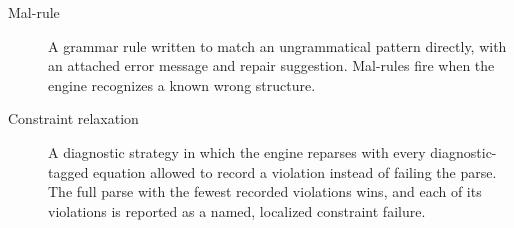 \documentclass[11pt]{article}
\theoremstyle{definition}
\theoremstyle{plain}
\theoremstyle{remark}
\begin{document}
\begin{description}
  \item[Mal-rule] A grammar rule written to match an ungrammatical pattern
  directly, with an attached error message and repair suggestion. Mal-rules fire
  when the engine recognizes a known wrong structure.

  \item[Constraint relaxation] A diagnostic strategy in which the engine
  reparses with every diagnostic-tagged equation allowed to record a violation
  instead of failing the parse. The full parse with the fewest recorded
  violations wins, and each of its violations is reported as a named, localized
  constraint failure.
\end{description}
\end{document}
